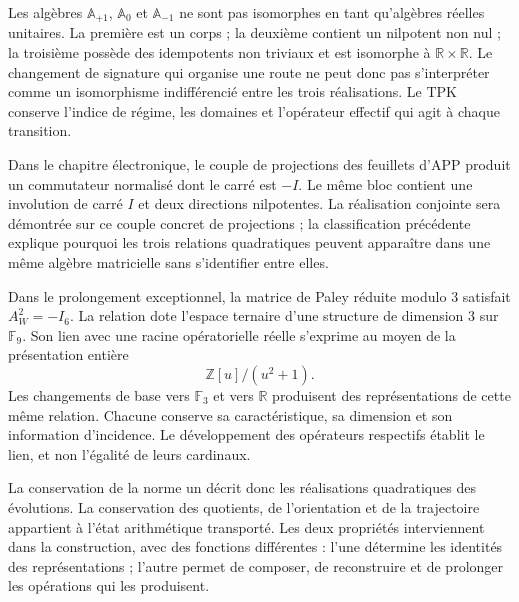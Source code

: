 Les algèbres \(\mathbb A_{+1}\), \(\mathbb A_0\) et
\(\mathbb A_{-1}\) ne sont pas isomorphes en tant qu'algèbres réelles unitaires.
La première est un corps ; la deuxième contient un nilpotent non nul ; la
troisième possède des idempotents non triviaux et est isomorphe à
\(\mathbb R\times\mathbb R\). Le changement de signature qui organise une
route ne peut donc pas s'interpréter comme un isomorphisme indifférencié entre les
trois réalisations. Le TPK conserve l'indice de régime, les domaines et
l'opérateur effectif qui agit à chaque transition.

Dans le chapitre électronique, le couple de projections des feuillets d'APP
produit un commutateur normalisé dont le carré est \(-I\). Le même bloc
contient une involution de carré \(I\) et deux directions nilpotentes. La
réalisation conjointe sera démontrée sur ce couple concret de projections ;
la classification précédente explique pourquoi les trois relations quadratiques
peuvent apparaître dans une même algèbre matricielle sans s'identifier entre elles.

Dans le prolongement exceptionnel, la matrice de Paley réduite modulo \(3\) satisfait \(A_W^2=-I_6\). La relation dote l'espace ternaire d'une structure de dimension \(3\) sur \(\mathbb F_9\). Son lien avec une racine opératorielle réelle s'exprime au moyen de la présentation entière
\[
 \mathbb Z[u]/(u^2+1).
\]
Les changements de base vers \(\mathbb F_3\) et vers \(\mathbb R\) produisent des
représentations de cette même relation. Chacune conserve sa caractéristique,
sa dimension et son information d'incidence. Le développement des
opérateurs respectifs établit le lien, et non l'égalité de leurs
cardinaux.

La conservation de la norme un décrit donc les réalisations
quadratiques des évolutions. La conservation des quotients, de l'orientation et de la
trajectoire appartient à l'état arithmétique transporté. Les deux propriétés
interviennent dans la construction, avec des fonctions différentes : l'une détermine les
identités des représentations ; l'autre permet de composer, de reconstruire et de
prolonger les opérations qui les produisent.




